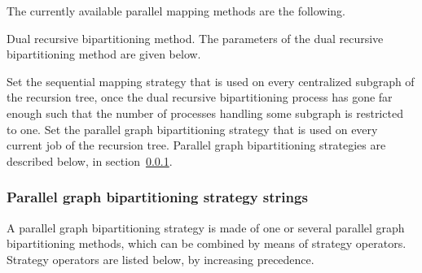 The currently available parallel mapping methods are the following.
\begin{itemize}
\iteme[{\tt r}]
Dual recursive bipartitioning method. The parameters of the dual recursive
bipartitioning method are given below.
\begin{itemize}
\iteme[{\tt seq=}{\it strat}]
Set the sequential mapping strategy that is used on every centralized
subgraph of the recursion tree, once the dual recursive bipartitioning
process has gone far enough such that the number of processes handling
some subgraph is restricted to one.
\iteme[{\tt sep=}{\it strat}]
Set the parallel graph bipartitioning strategy that is used on every
current job of the recursion tree. Parallel graph bipartitioning
strategies are described below, in section~\ref{sec-lib-format-strat-pbipart}.
\end{itemize}
\end{itemize}

\subsubsection{Parallel graph bipartitioning strategy strings}
\label{sec-lib-format-strat-pbipart}

A parallel graph bipartitioning strategy is made of one or several
parallel graph bipartitioning methods, which can be combined by means
of strategy operators. Strategy operators are listed below, by
increasing precedence.

